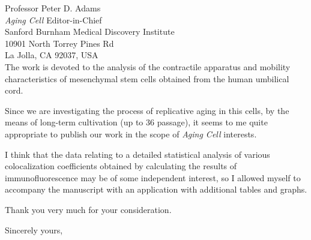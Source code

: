 \documentclass[11pt]{letter} %
\begin{document}
\begin{letter}{
Professor Peter D. Adams \\
\emph{Aging Cell} Editor-in-Chief \\
Sanford Burnham Medical Discovery Institute \\
10901 North Torrey Pines Rd \\
La Jolla, CA 92037, USA\\}
The work is devoted to the analysis of the contractile apparatus and mobility characteristics of mesenchymal stem cells obtained from the human umbilical cord.

Since we are investigating the process of replicative aging in this cells, by the means of long-term cultivation (up to 36 passage), it seems to me quite appropriate to publish our work in the scope of \emph{Aging Cell} interests.

I think that the data relating to a detailed statistical analysis of various colocalization coefficients obtained by calculating the results of immunofluorescence may be of some independent interest, so I allowed myself to accompany the manuscript with an application with additional tables and graphs.

Thank you very much for your consideration.

\closing{Sincerely yours, }




\end{letter}
\end{document}
